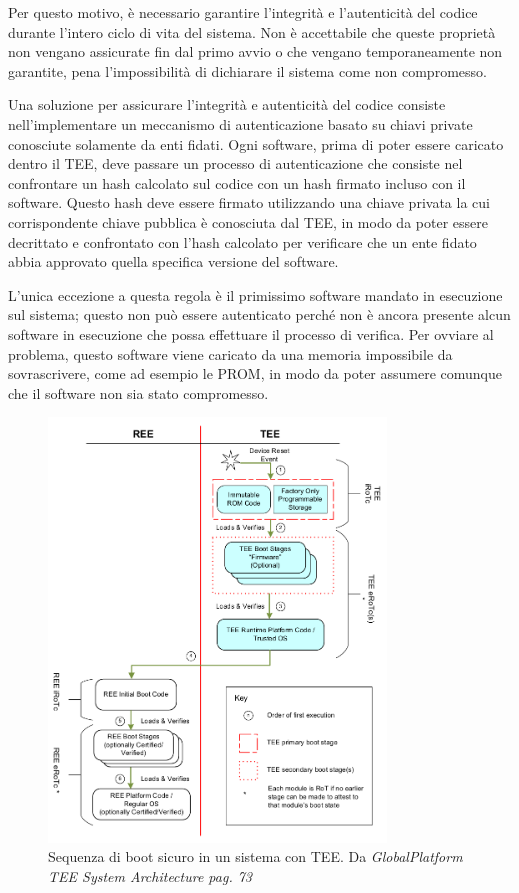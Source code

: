 \documentclass[12pt,italian]{report}
\begin{document}
Per questo motivo, è necessario garantire l'integrità e l'autenticità del
codice durante l'intero ciclo di vita del sistema.
Non è accettabile che queste proprietà non vengano assicurate fin dal primo
avvio o che vengano temporaneamente non garantite, pena l'impossibilità di
dichiarare il sistema come non compromesso.

Una soluzione per assicurare l'integrità e autenticità del codice consiste
nell'implementare un meccanismo di autenticazione basato su chiavi
private conosciute solamente da enti fidati.
Ogni software, prima di poter essere caricato dentro il TEE, deve
passare un processo di autenticazione che consiste nel confrontare un hash
calcolato sul codice con un hash firmato incluso con il software.
Questo hash deve essere firmato utilizzando una chiave privata la cui
corrispondente chiave pubblica è conosciuta dal TEE, in modo da poter
essere decrittato e confrontato con l'hash calcolato per
verificare che un ente fidato abbia approvato quella specifica versione
del software. 

L'unica eccezione a questa regola è il primissimo software mandato
in esecuzione sul sistema; questo non può essere autenticato perché non
è ancora presente alcun software in esecuzione che possa effettuare il
processo di verifica.
Per ovviare al problema, questo software viene caricato da una memoria
impossibile da sovrascrivere, come ad esempio le PROM, in modo da
poter assumere comunque che il software non sia stato compromesso.

\begin{figure}
\centering
\includegraphics[width=0.8\textwidth]{immagini/tee-boot-sequence}
\caption{
    Sequenza di boot sicuro in un sistema con TEE. 
    Da \textit{GlobalPlatform TEE System Architecture pag. 73}
    \cite{gp2020systemarchitecture}
}
\end{figure}
\end{document}
